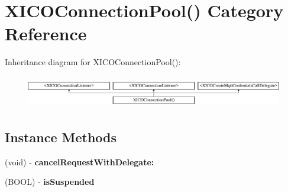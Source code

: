 \hypertarget{category_x_i_c_o_connection_pool_07_08}{}\section{X\+I\+C\+O\+Connection\+Pool() Category Reference}
\label{category_x_i_c_o_connection_pool_07_08}
Inheritance diagram for X\+I\+C\+O\+Connection\+Pool()\+:\begin{figure}[H]
\begin{center}
\leavevmode
\includegraphics[height=1.424936cm]{category_x_i_c_o_connection_pool_07_08}
\end{center}
\end{figure}
\subsection*{Instance Methods}
\begin{DoxyCompactItemize}
\item 
\hypertarget{category_x_i_c_o_connection_pool_07_08_aa33b4fb3834ac54cedb3e8167ab0cb5d}{}\label{category_x_i_c_o_connection_pool_07_08_aa33b4fb3834ac54cedb3e8167ab0cb5d} 
(void) -\/ {\bfseries cancel\+Request\+With\+Delegate\+:}
\item 
\hypertarget{category_x_i_c_o_connection_pool_07_08_a0d303fa422389bafe1ea9409611c7ef6}{}\label{category_x_i_c_o_connection_pool_07_08_a0d303fa422389bafe1ea9409611c7ef6} 
(B\+O\+OL) -\/ {\bfseries is\+Suspended}
\end{DoxyCompactItemize}
